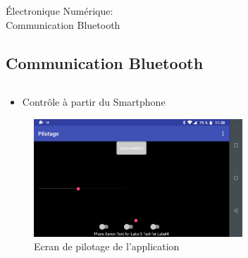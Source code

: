 \documentclass{beamer}
\begin{document}
	\begin{frame}{Électronique Numérique:\\Communication Bluetooth}
		\subsection[Bluetooth]{Communication Bluetooth}
		\begin{columns}[T]
	  		\begin{column}{0.5\textwidth}
		    	\begin{itemize}
		    		\item Contrôle à partir du Smartphone
		    	\end{itemize}
		    	\begin{figure}
		    		\includegraphics[width=0.8\textwidth]{"../Illus/AppPilotage.png"}
	    			\caption{Ecran de pilotage de l'application}
	    		 \end{figure}
	  		\end{column}
	  		\begin{column}{0.5\textwidth}
	  			\begin{figure}

\end{figure}
\end{column}
\end{columns}
\end{frame}
\end{document}
